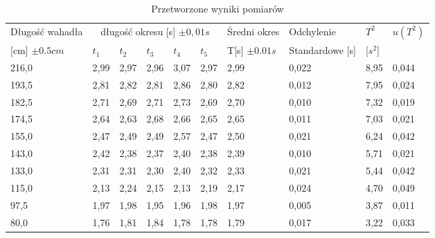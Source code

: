 \documentclass[a4paper,12pt]{article}
\begin{document}
\begin{table}[h]
	\centering
	\footnotesize
	\begin{tabular}{|l|l|l|l|l|l|l|l|l|l|}
		\hline
		Długość wahadła    & \multicolumn{5}{c|}{długość okresu [s] $\pm 0,01s$} & Średni okres & Odchylenie & $T^2$ & $u(T^2)$                                                        \\
		{[cm] $\pm 0.5cm$} & $t_1$                                               & $t_2$        & $t_3$      & $t_4$ & $t_5$    & T[s] $\pm 0.01s$ & Standardowe [s] & [$s^2$] &       \\\hline
		216,0              & 2,99                                                & 2,97         & 2,96       & 3,07  & 2,97     & 2,99             & 0,022           & 8,95    & 0,044 \\\hline
		193,5              & 2,81                                                & 2,82         & 2,81       & 2,86  & 2,80     & 2,82             & 0,012           & 7,95    & 0,024 \\\hline
		182,5              & 2,71                                                & 2,69         & 2,71       & 2,73  & 2,69     & 2,70             & 0,010           & 7,32    & 0,019 \\\hline
		174,5              & 2,64                                                & 2,63         & 2,68       & 2,66  & 2,65     & 2,65             & 0,011           & 7,03    & 0,021 \\\hline
		155,0              & 2,47                                                & 2,49         & 2,49       & 2,57  & 2,47     & 2,50             & 0,021           & 6,24    & 0,042 \\\hline
		143,0              & 2,42                                                & 2,38         & 2,37       & 2,40  & 2,38     & 2,39             & 0,010           & 5,71    & 0,021 \\\hline
		133,0              & 2,31                                                & 2,31         & 2,30       & 2,40  & 2,32     & 2,33             & 0,021           & 5,44    & 0,042 \\\hline
		115,0              & 2,13                                                & 2,24         & 2,15       & 2,13  & 2,19     & 2,17             & 0,024           & 4,70    & 0,049 \\\hline
		97,5               & 1,97                                                & 1,98         & 1,95       & 1,96  & 1,98     & 1,97             & 0,005           & 3,87    & 0,011 \\\hline
		80,0               & 1,76                                                & 1,81         & 1,84       & 1,78  & 1,78     & 1,79             & 0,017           & 3,22    & 0,033 \\\hline
	\end{tabular}
	\caption{Przetworzone wyniki pomiarów}
\end{table}
\clearpage
\end{document}
